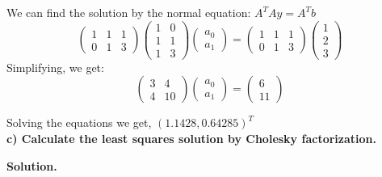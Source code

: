 \documentclass[12pt, oneside]{article}   	%
\begin{document}
\begin{enumerate}
	We can find the solution by the normal equation: $A^TAy=A^Tb$
	$$\left(\begin{array}{ccc}1&1&1\\0&1&3\end{array}\right) \left(\begin{array}{cc}1&0\\1&1\\1&3\end{array}\right)\left(\begin{array}{c}a_0\\a_1\end{array}\right)=\left(\begin{array}{ccc}1&1&1\\0&1&3\end{array}\right)\left(\begin{array}{c}1\\2\\3\end{array}\right)$$
	Simplifying, we get:$$\left(\begin{array}{cc}3&4\\4&10\end{array}\right)\left(\begin{array}{c}a_0\\a_1\end{array}\right)=\left(\begin{array}{c}6\\11\end{array}\right)$$
	
	Solving the equations we get, $(1.1428, 0.64285)^T$\\
	
	\textbf{c) Calculate the least squares solution by Cholesky factorization.}
	
	\textbf{Solution.}\\
	

\end{enumerate}
\end{document}
